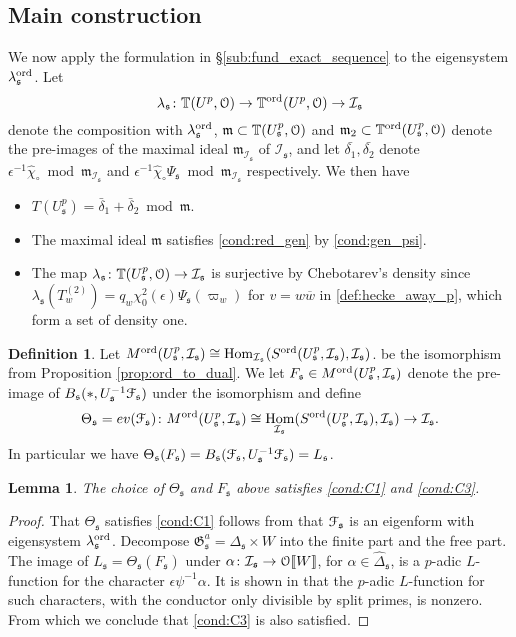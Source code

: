 \documentclass[leqno]{amsart}
\newtheorem{lem}[thm]{Lemma}
\theoremstyle{definition}
\newtheorem{defn}[thm]{Definition}
\theoremstyle{remark}
\newcommand{\eo}{\EuScript{O}}
\DeclareMathOperator{\Hom}{Hom}
\newcommand{\fm}{\mathfrak{m}}
\newcommand{\fs}{\mathfrak{s}}
\newcommand{\bw}{\overline{w}}
\newcommand{\fG}{\mathfrak{G}}
\newcommand{\TT}{\mathbb{T}} %
\newcommand{\euF}{\EuScript{F}} %
\newcommand{\I}{\mathcal{I}} %
\newcommand{\ord}{\textnormal{ord}} %
\begin{document}
\subsection{Main construction}

We now apply the formulation in \S\ref{sub:fund_exact_sequence}
to the eigensystem $\lambda^{\ord}_\fs$. Let
\[
    \lambda_\fs\colon \TT(U^p,\eo)\to\TT^{\ord}(U^p,\eo)\to\I_\fs
\]
denote the composition with $\lambda^{\ord}_\fs$,
$\fm\subset \TT(U^p_\fs,\eo)$ and
$\fm_2\subset \TT^\ord(U^p_\fs,\eo)$
denote the pre-images of the maximal ideal $\fm_{\I_\fs}$ of $\I_\fs$,
and let $\bar{\delta_1}, \bar{\delta_2}$
denote $\epsilon^{-1}\hat{\chi}_\circ\bmod \fm_{\I_\fs}$ 
and $\epsilon^{-1}\hat{\chi}_\circ\Psi_\fs\bmod \fm_{\I_\fs}$ 
respectively. We then have
\begin{itemize}
\item $T(U^p_\fs)=\bar{\delta}_1+\bar{\delta}_2\bmod \fm$.
\item The maximal ideal $\fm$ satisfies \eqref{cond:red_gen}
by \eqref{cond:gen_psi}.
\item The map $\lambda_\fs\colon \TT(U^p_\fs,\eo)\to \I_\fs$
is surjective by Chebotarev's density
since $\lambda_\fs(T_w^{(2)})=q_w\chi_0^2(\epsilon)\Psi_\fs(\varpi_w)$
for $v=w\bw$ in \eqref{def:hecke_away_p},
which form a set of density one.
\end{itemize}

\begin{defn}
Let $M^{\ord}(U^p_\fs,\I_\fs)\cong\Hom_{\I_\fs}
(S^{\ord}(U^p_\fs,\I_\fs),\I_\fs)$.
be the isomorphism from Proposition \ref{prop:ord_to_dual}.
We let $F_\fs\in M^{\ord}(U^p_\fs,\I_\fs)$
denote the pre-image of
$B_{\fs}(*,U_\fs^{-1}\euF_{\fs})$
under the isomorphism and define
\[
    \Theta_\fs=ev(\euF_\fs)\colon 
    M^{\ord}(U^p_\fs,\I_\fs)\cong\Hom_{\I_\fs}
    (S^{\ord}(U^p_\fs,\I_\fs),\I_\fs)\to\I_\fs.
\]
In particular we have $\Theta_\fs(F_\fs)=
B_\fs(\euF_\fs,U_\fs^{-1}\euF_\fs)=L_\fs$.
\end{defn}

\begin{lem}
The choice of $\Theta_\fs$ and $F_\fs$ above
satisfies \ref{cond:C1} and \ref{cond:C3}.
\end{lem}
\begin{proof}
That $\Theta_\fs$ satisfies \ref{cond:C1} 
follows from that $\euF_\fs$ is an eigenform
with eigensystem $\lambda_\fs^{\ord}$.
Decompose $\fG_\fs^a=\Delta_\fs\times W$
into the finite part and the free part.
The image of $L_\fs=\Theta_\fs(F_\fs)$
under $\alpha\colon \I_\fs\to \eo\llbracket W\rrbracket$,
for $\alpha\in\hat{\Delta}_\fs$,
is a $p$-adic $L$-function 
for the character $\epsilon\psi^{-1}\alpha$.
It is shown in \cite{Hida10}
that the $p$-adic $L$-function for such characters,
with the conductor only divisible by split primes,
is nonzero.
From which we conclude that \ref{cond:C3}
is also satisfied.
\end{proof}
\end{document}
